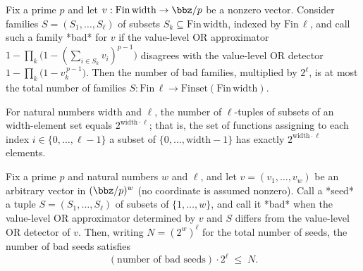 \begin{lemma}
\label{RazborovSmolensky.count_bad_S}
\leanok
{}
Fix a prime $p$ and let $v : \mathrm{Fin}\,\mathrm{width} \to \bbz/p$ be a nonzero
vector. Consider families $S = (S_1,\dots,S_\ell)$ of subsets $S_k \subseteq
\mathrm{Fin}\,\mathrm{width}$, indexed by $\mathrm{Fin}\,\ell$, and call such a family
*bad* for $v$ if the value-level OR approximator $1 - \prod_k\bigl(1 - (\sum_{i \in S_k}
v_i)^{p-1}\bigr)$ disagrees with the value-level OR detector $1 - \prod_k\bigl(1 -
v_k^{\,p-1}\bigr)$. Then the number of bad families, multiplied by $2^\ell$, is at most
the total number of families $S : \mathrm{Fin}\,\ell \to
\mathrm{Finset}(\mathrm{Fin}\,\mathrm{width})$.
\end{lemma}

\begin{lemma}
\label{RazborovSmolensky.approxSeed_card}
\leanok
{}
For natural numbers $\mathrm{width}$ and $\ell$, the number of $\ell$-tuples of subsets
of an $\mathrm{width}$-element set equals $2^{\mathrm{width}\cdot\ell}$; that is, the
set of functions assigning to each index $i \in \{0,\dots,\ell-1\}$ a subset of
$\{0,\dots,\mathrm{width}-1\}$ has exactly $2^{\mathrm{width}\cdot\ell}$ elements.
\end{lemma}

\begin{lemma}
\label{RazborovSmolensky.count_bad_S_or}
\leanok
{}
Fix a prime $p$ and natural numbers $w$ and $\ell$, and let $v = (v_1,\dots,v_w)$ be an
arbitrary vector in $(\bbz/p)^w$ (no coordinate is assumed nonzero). Call a *seed* a
tuple $S = (S_1,\dots,S_\ell)$ of subsets of $\{1,\dots,w\}$, and call it *bad* when the
value-level OR approximator determined by $v$ and $S$ differs from the value-level OR
detector of $v$. Then, writing $N = (2^{w})^{\ell}$ for the total number of seeds, the
number of bad seeds satisfies
\[
(\text{number of bad seeds})\cdot 2^{\ell} \;\le\; N.
\]
\end{lemma}

